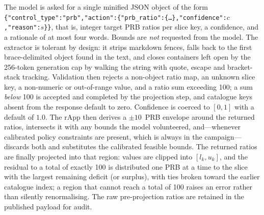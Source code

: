 The model is asked for a single minified JSON object of the form \texttt{\{"control\_type":"prb","action":\{"prb\_ratio":\{\dots\},"confidence":$c$,"reason":$s$\}\}}, that is, integer target PRB ratios per slice key, a confidence, and a rationale of at most four words. Bounds are \emph{not} requested from the model. The extractor is tolerant by design: it strips markdown fences, falls back to the first brace-delimited object found in the text, and closes containers left open by the 256-token generation cap by walking the string with quote, escape and bracket-stack tracking. Validation then rejects a non-object ratio map, an unknown slice key, a non-numeric or out-of-range value, and a ratio sum exceeding 100; a sum \emph{below} 100 is accepted and completed by the projection step, and catalogue keys absent from the response default to zero. Confidence is coerced to $[0,1]$ with a default of $1.0$. The rApp then derives a $\pm10$~PRB envelope around the returned ratios, intersects it with any bounds the model volunteered, and---whenever calibrated policy constraints are present, which is always in the campaign---discards both and substitutes the calibrated feasible bounds. The returned ratios are finally projected into that region: values are clipped into $[l_k,u_k]$, and the residual to a total of exactly 100 is distributed one PRB at a time to the slice with the largest remaining deficit (or surplus), with ties broken toward the earlier catalogue index; a region that cannot reach a total of 100 raises an error rather than silently renormalising. The raw pre-projection ratios are retained in the published payload for audit.

